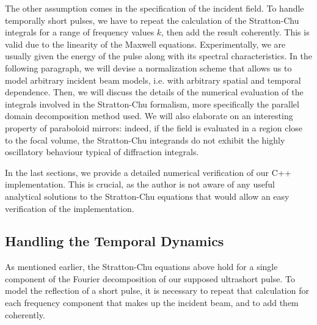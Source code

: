 \documentclass[11pt,SymmetricalJury]{inrsthesis/inrsthesis}
\begin{document}
The other assumption comes in the specification of the incident field. To handle
temporally short pulses, we have to repeat the calculation of the Stratton-Chu
integrals for a range of frequency values $k$, then add the result coherently.
This is valid due to the linearity of the Maxwell equations. Experimentally, we
are usually given the energy of the pulse along with its spectral
characteristics. In the following paragraph, we will devise a normalization
scheme that allows us to model arbitrary incident beam models, i.e. with
arbitrary spatial and temporal dependence. Then, we will discuss the details of
the numerical evaluation of the integrals involved in the Stratton-Chu
formalism, more specifically the parallel domain decomposition method used. We
will also elaborate on an interesting property of paraboloid mirrors: indeed, if
the field is evaluated in a region close to the focal volume, the Stratton-Chu
integrands do not exhibit the highly oscillatory behaviour typical of
diffraction integrals.




In the last sections, we provide a detailed numerical verification of our C++
implementation. This is crucial, as the author is not aware of any useful
analytical solutions to the Stratton-Chu equations that would allow an easy
verification of the implementation.

\subsection{Handling the Temporal Dynamics}

As mentioned earlier, the Stratton-Chu equations above hold for a single
component of the Fourier decomposition of our supposed ultrashort pulse. To
model the reflection of a short pulse, it is necessary to repeat that
calculation for each frequency component that makes up the incident beam, and to
add them coherently.
\end{document}
